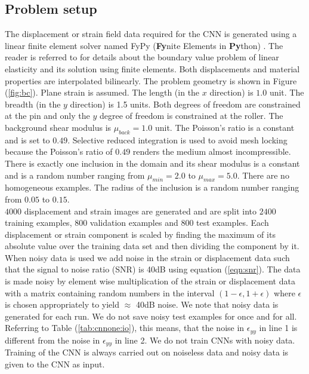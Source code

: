 \documentclass[12pt]{article}
\begin{document}
\subsection{\label{sect:probsetup}Problem setup}
The displacement or strain field data required for the CNN is generated using a linear finite element solver named FyPy (\textbf{Fy}nite Elements in \textbf{Py}thon) \cite{misc:fypy}. The reader is referred to \cite{book:hugheslinear,book:fishbelytschko} for details about the boundary value problem of linear elasticity and its solution using finite elements. Both displacements and material properties are interpolated bilinearly. The problem geometry is shown in Figure (\ref{fig:bc}). Plane strain is assumed. The length (in the $x$ direction) is $1.0$ unit. The breadth (in the $y$ direction) is 1.5 units. Both degrees of freedom are constrained at the pin and only the $y$ degree of freedom is constrained at the roller. The background shear modulus is $\mu_{back}=1.0$ unit. The Poisson's ratio is a constant and is set to $0.49$. Selective reduced integration is used to avoid mesh locking because the Poisson's ratio of $0.49$ renders the medium almost incompressible. There is exactly one inclusion in the domain and its shear modulus is a constant and is a random number ranging from $\mu_{min}=2.0$ to $\mu_{max}=5.0$. There are no homogeneous examples. The radius of the inclusion is a random number ranging from $0.05$ to $0.15$.\\
$4000$ displacement and strain images are generated and are split into $2400$ training examples, $800$ validation examples and $800$ test examples. Each displacement or strain component is scaled by finding the maximum of its absolute value over the training data set and then dividing the component by it. When noisy data is used we add noise in the strain or displacement data such that the signal to noise ratio (SNR) is 40dB using equation (\ref{eqn:snr}). The data is made noisy by element wise multiplication of the strain or displacement data with a matrix containing random numbers in the interval $(1-\epsilon,1+\epsilon)$ where $\epsilon$ is chosen appropriately to yield $\approx$ 40dB noise. We note that noisy data is generated for each run. We do not save noisy test examples for once and for all. Referring to Table (\ref{tab:cnnone:io}), this means, that the noise in $\epsilon_{yy}$ in line 1 is different from the noise in $\epsilon_{yy}$ in line 2. We do not train CNNs with noisy data. Training of the CNN is always carried out on noiseless data and noisy data is given to the CNN as input. 
\end{document}
